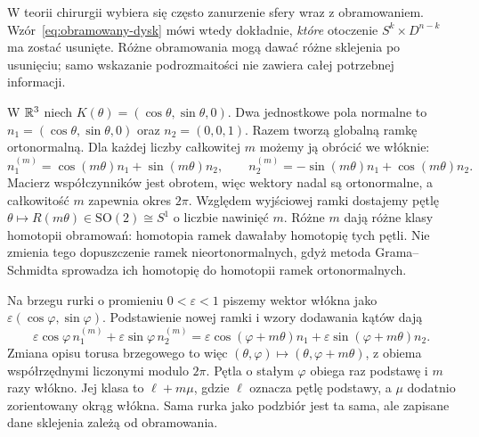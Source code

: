 W teorii chirurgii wybiera się
często zanurzenie sfery wraz z
obramowaniem. Wzór~\eqref{eq:obramowany-dysk}
mówi wtedy dokładnie, \emph{które}
otoczenie $S^k\times D^{n-k}$
ma zostać usunięte. Różne obramowania
mogą dawać różne sklejenia po usunięciu;
samo wskazanie podrozmaitości
nie zawiera całej potrzebnej informacji.

\begin{przyklad}
\label{prz:obramowania-okregu-20}
W $\mathbb{R}^3$ niech $K(\theta)=(\cos\theta,\sin\theta,0)$.
Dwa jednostkowe pola normalne to
$n_1=(\cos\theta,\sin\theta,0)$ oraz $n_2=(0,0,1)$.
Razem tworzą globalną ramkę ortonormalną.
Dla każdej liczby całkowitej $m$ możemy ją obrócić we włóknie:
\[
 n_1^{(m)}=\cos(m\theta)n_1+\sin(m\theta)n_2,\qquad
 n_2^{(m)}=-\sin(m\theta)n_1+\cos(m\theta)n_2.
\]
Macierz współczynników jest obrotem, więc wektory nadal
są ortonormalne, a całkowitość $m$ zapewnia okres $2\pi$.
Względem wyjściowej ramki dostajemy pętlę
$\theta\mapsto R(m\theta)\in\mathrm{SO}(2)\cong S^1$
o liczbie nawinięć $m$.
Różne $m$ dają różne klasy homotopii obramowań:
homotopia ramek dawałaby homotopię tych pętli.
Nie zmienia tego dopuszczenie ramek nieortonormalnych,
gdyż metoda Grama--Schmidta sprowadza ich homotopię
do homotopii ramek ortonormalnych.

Na brzegu rurki o promieniu $0<\varepsilon<1$
piszemy wektor włókna jako
$\varepsilon(\cos\varphi,\sin\varphi)$.
Podstawienie nowej ramki i wzory dodawania kątów dają
\[
 \varepsilon\cos\varphi\,n_1^{(m)}
 +\varepsilon\sin\varphi\,n_2^{(m)}
 =\varepsilon\cos(\varphi+m\theta)n_1
  +\varepsilon\sin(\varphi+m\theta)n_2.
\]
Zmiana opisu torusa brzegowego to więc
$(\theta,\varphi)\mapsto(\theta,\varphi+m\theta)$,
z obiema współrzędnymi liczonymi modulo $2\pi$.
Pętla o stałym $\varphi$ obiega raz podstawę i $m$ razy
włókno. Jej klasa to $\ell+m\mu$, gdzie $\ell$ oznacza
pętlę podstawy, a $\mu$ dodatnio zorientowany okrąg włókna.
Sama rurka jako podzbiór jest ta sama,
ale zapisane dane sklejenia zależą od obramowania.

\begin{center}
\end{center}
\end{przyklad}

